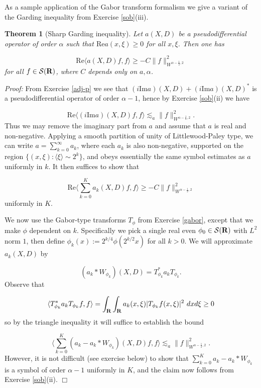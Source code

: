 \documentclass[11pt]{article}
\newtheorem{theorem}{Theorem}
\theoremstyle{definition}
\theoremstyle{remark}
\begin{document}
As a sample application of the Gabor transform formalism we give a variant of the Garding inequality from Exercise \ref{sob}(iii).


\begin{theorem}[Sharp Garding inequality]
  Let \({a(X,D)}\) be a pseudodifferential operator of order \({\alpha}\) such that \({\mathrm{Re} a(x,\xi) \geq 0}\) for all \({x,\xi}\). Then one has 

\[\displaystyle  \mathrm{Re} \langle a(X,D) f, f \rangle \geq -C \|f\|_{W^{\alpha-\frac{1}{2},2}}^2\]
 for all \({f \in {\mathcal S}({\bf R})}\), where \({C}\) depends only on \({a,\alpha}\). 

\end{theorem}

\emph{Proof:}  From Exercise \ref{adj-p} we see that \({(i \mathrm{Im} a)(X,D) + (i \mathrm{Im} a)(X,D)^*}\) is a pseudodifferential operator of order \({\alpha-1}\), hence by Exercise \ref{sob}(ii) we have 

\[\displaystyle  \mathrm{Re} \langle (i \mathrm{Im} a)(X,D) f, f \rangle \lesssim_a \|f\|_{W^{\alpha-\frac{1}{2},2}}^2.\]
 Thus we may remove the imaginary part from \({a}\) and assume that \({a}\) is real and non-negative. Applying a smooth partition of unity of Littlewood-Paley type, we can write \({a = \sum_{k=0}^\infty a_k}\), where each \({a_k}\) is also non-negative, supported on the region \({\{ (x,\xi): \langle \xi \rangle \sim 2^k \}}\), and obeys essentially the same symbol estimates as \({a}\) uniformly in \({k}\). It then suffices to show that 

\[\displaystyle  \mathrm{Re} \langle \sum_{k=0}^K a_k(X,D) f, f \rangle \geq -C \|f\|_{W^{\alpha-\frac{1}{2},2}}^2\]
 uniformly in \({K}\). 


We now use the Gabor-type transforms \({T_\phi}\) from Exercise \ref{gabor}, except that we make \({\phi}\) dependent on \({k}\). Specifically we pick a single real even \({\phi_0 \in {\mathcal S}({\bf R})}\) with \({L^2}\) norm \({1}\), then define \({\phi_k(x) := 2^{k/4} \phi(2^{k/2} x)}\) for all \({k>0}\). We will approximate \({a_k(X,D)}\) by 

\[\displaystyle  (a_k * W_{\phi_k})(X,D) = T_{\phi_k}^* a_k T_{\phi_k}.\]
 Observe that 

\[\displaystyle  \langle T_{\phi_k}^* a_k T_{\phi_k} f, f \rangle = \int_{\bf R} \int_{\bf R} a_k(x,\xi) |T_{\phi_k}f(x,\xi)|^2\ dx d\xi \geq 0\]
 so by the triangle inequality it will suffice to establish the bound 

\[\displaystyle  \langle \sum_{k=0}^K (a_k - a_k * W_{\phi_k})(X,D) f, f \rangle \lesssim_a \|f\|_{W^{\alpha-\frac{1}{2},2}}^2.\]
 However, it is not difficult (see exercise below) to show that \({\sum_{k=0}^K a_k - a_k * W_{\phi_k}}\) is a symbol of order \({\alpha-1}\) uniformly in \({K}\), and the claim now follows from Exercise \ref{sob}(ii). \(\Box\)
\end{document}
